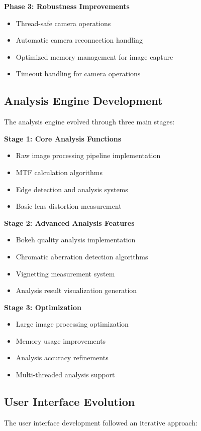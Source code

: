 \textbf{Phase 3: Robustness Improvements}
\begin{itemize}
    \item Thread-safe camera operations
    \item Automatic camera reconnection handling
    \item Optimized memory management for image capture
    \item Timeout handling for camera operations
\end{itemize}

\subsection{Analysis Engine Development}
The analysis engine evolved through three main stages:

\textbf{Stage 1: Core Analysis Functions}
\begin{itemize}
    \item Raw image processing pipeline implementation
    \item MTF calculation algorithms
    \item Edge detection and analysis systems
    \item Basic lens distortion measurement %
\end{itemize}

\textbf{Stage 2: Advanced Analysis Features}
\begin{itemize}
    \item Bokeh quality analysis implementation
    \item Chromatic aberration detection algorithms
    \item Vignetting measurement system
    \item Analysis result visualization generation
\end{itemize}

\textbf{Stage 3: Optimization}
\begin{itemize}
    \item Large image processing optimization
    \item Memory usage improvements
    \item Analysis accuracy refinements
    \item Multi-threaded analysis support
\end{itemize}

\subsection{User Interface Evolution}
The user interface development followed an iterative approach:

